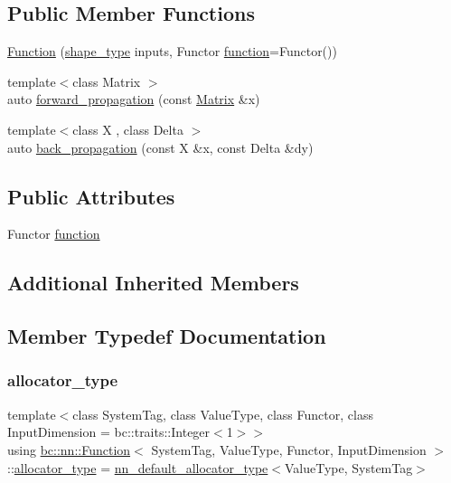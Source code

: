 \subsection*{Public Member Functions}
\begin{DoxyCompactItemize}
\item 
\hyperlink{structbc_1_1nn_1_1Function_a276e54e414ef1b95297d04bb1881b054}{Function} (\hyperlink{structbc_1_1nn_1_1Function_ab8cbdaad20a0270b2555a91676a79932}{shape\+\_\+type} inputs, Functor \hyperlink{structbc_1_1nn_1_1Function_a5fd3a0023d9abfe4ce4dc513863a6d06}{function}=Functor())
\item 
{\footnotesize template$<$class Matrix $>$ }\\auto \hyperlink{structbc_1_1nn_1_1Function_a516b68e5ff7077887e30a2a6df73a64b}{forward\+\_\+propagation} (const \hyperlink{namespacebc_a92dd1e243183b382432a5fac3ed8b89f}{Matrix} \&x)
\item 
{\footnotesize template$<$class X , class Delta $>$ }\\auto \hyperlink{structbc_1_1nn_1_1Function_a3e07048b3c63a0625f447d37002e49b2}{back\+\_\+propagation} (const X \&x, const Delta \&dy)
\end{DoxyCompactItemize}
\subsection*{Public Attributes}
\begin{DoxyCompactItemize}
\item 
Functor \hyperlink{structbc_1_1nn_1_1Function_a5fd3a0023d9abfe4ce4dc513863a6d06}{function}
\end{DoxyCompactItemize}
\subsection*{Additional Inherited Members}


\subsection{Member Typedef Documentation}
\mbox{\label{structbc_1_1nn_1_1Function_aeb0024acff31772fe200f6c609b17ff4}} 
\subsubsection{\texorpdfstring{allocator\+\_\+type}{allocator\_type}}
{\footnotesize\ttfamily template$<$class System\+Tag, class Value\+Type, class Functor, class Input\+Dimension = bc\+::traits\+::\+Integer$<$1$>$$>$ \\
using \hyperlink{structbc_1_1nn_1_1Function}{bc\+::nn\+::\+Function}$<$ System\+Tag, Value\+Type, Functor, Input\+Dimension $>$\+::\hyperlink{structbc_1_1nn_1_1Function_aeb0024acff31772fe200f6c609b17ff4}{allocator\+\_\+type} =  \hyperlink{namespacebc_1_1nn_a0025752fc3f47f988b3fae106c825860}{nn\+\_\+default\+\_\+allocator\+\_\+type}$<$Value\+Type, System\+Tag$>$}

